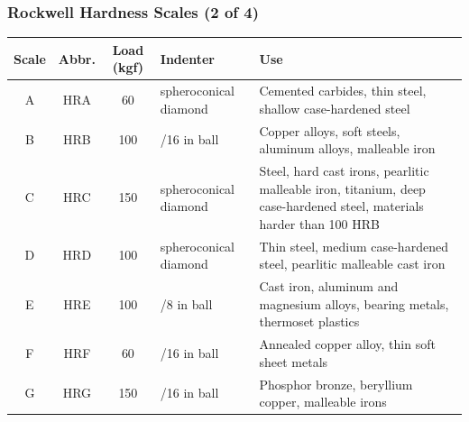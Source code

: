 \begin{frame}
	\frametitle{Rockwell Hardness Scales (2 of 4)}

    \begin{table}
        \centering
        \footnotesize
        \setlength{\tabcolsep}{4pt}
        \begin{tabularx}{\linewidth}{
            c
            c
            c
            >{\hsize=0.65\hsize\raggedright\arraybackslash}X
            >{\hsize=1.35\hsize\raggedright\arraybackslash}X
        }
            \toprule
                Scale & Abbr. & Load (kgf) & Indenter & Use \\
            \midrule
                A & HRA & 60  & spheroconical diamond & Cemented carbides, thin steel, shallow case-hardened steel \\
                B & HRB & 100 & 1/16 in ball          & Copper alloys, soft steels, aluminum alloys, malleable iron \\
                C & HRC & 150 & spheroconical diamond & Steel, hard cast irons, pearlitic malleable iron, titanium, deep case-hardened steel, materials harder than 100 HRB \\
                D & HRD & 100 & spheroconical diamond & Thin steel, medium case-hardened steel, pearlitic malleable cast iron \\
                E & HRE & 100 & 1/8 in ball           & Cast iron, aluminum and magnesium alloys, bearing metals, thermoset plastics \\
                F & HRF & 60  & 1/16 in ball          & Annealed copper alloy, thin soft sheet metals \\
                G & HRG & 150 & 1/16 in ball          & Phosphor bronze, beryllium copper, malleable irons \\
            \bottomrule
        \end{tabularx}
    \end{table}
\end{frame}


